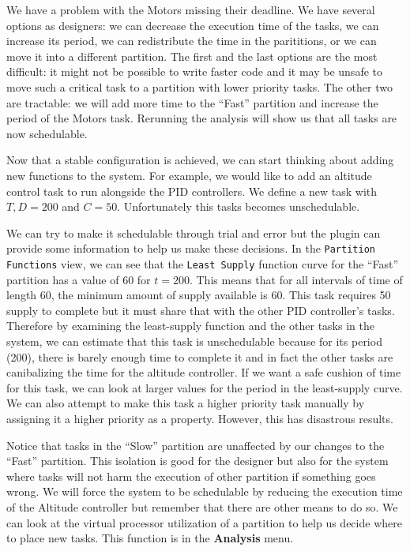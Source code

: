 We have a problem with the Motors missing their deadline. We have several
options as designers: we can decrease the execution time of the tasks,
we can increase its period, we can redistribute the time in the parititions,
or we can move it into a different partition.
The first and the last options are the most difficult: it might not be
possible to write faster code and it may be unsafe to move such a critical
task to a partition with lower priority tasks. The other two are tractable:
we will add more time to the ``Fast'' partition and increase the period
of the Motors task. Rerunning the analysis will show us that all tasks
are now schedulable.

Now that a stable configuration is achieved, we can start thinking about 
adding new functions to the system. For example, we would like to add an
altitude control task to run alongside the PID controllers.
We define a new task with $T,D = 200$ and $C = 50$. Unfortunately this
tasks becomes unschedulable.

We can try to make it schedulable through trial and error but the plugin
can provide some information to help us make these decisions.
In the \texttt{Partition Functions} view, we can see that the \texttt{Least Supply}
function curve for the ``Fast'' partition has a value of 60 for $t = 200$. This
means that for all intervals of time of length 60, the minimum amount of supply
available is 60. This task requires 50 supply to complete but it must share
that with the other PID controller's tasks. Therefore by examining the least-supply
function and the other tasks in the system, we can estimate that this task
is unschedulable because for its period (200), there is barely enough time
to complete it and in fact the other tasks are canibalizing the time
for the altitude controller. If we want a safe cushion of time for this task,
we can look at larger values for the period in the least-supply curve.
We can also attempt to make this task a higher priority task manually
by assigning it a higher priority as a property. However, this 
has disastrous results. 

Notice that tasks in the ``Slow'' partition are unaffected by our changes to the
``Fast'' partition. This isolation is good for the designer but also for
the system where tasks will not harm the execution of other partition
if something goes wrong. We will force the system to be schedulable
by reducing the execution time of the Altitude controller but remember
that there are other means to do so.
We can look at the virtual processor utilization of a partition
to help us decide where to place new tasks. This function is in the
\textbf{Analysis} menu. 

